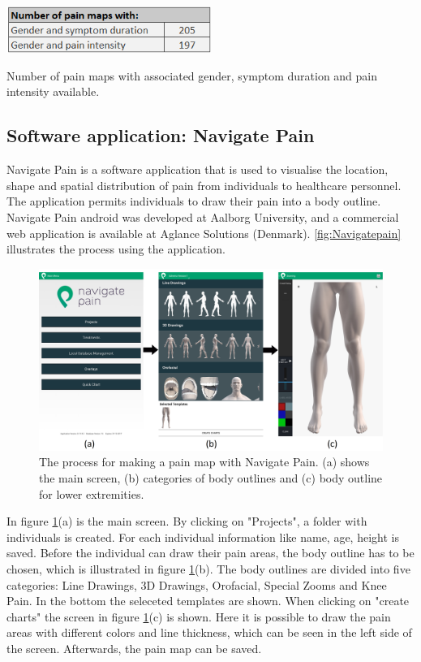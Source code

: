\begin{table} [H]
\centering
\includegraphics[width=0.5\textwidth]{figures/numberofpain}
\caption{Number of pain maps with associated gender, symptom duration and pain intensity  available. }
\label{tab:numberofpain}
\end{table}


\subsection{Software application: Navigate Pain} \label{sec:nav}
Navigate Pain is a software application that is used to visualise the location, shape and spatial distribution of pain from individuals to healthcare personnel. The application permits individuals to draw their pain into a body outline. Navigate Pain android was developed at Aalborg University, and a commercial web application is available at Aglance Solutions (Denmark).\citep{Solutions2015}
\autoref{fig:Navigatepain} illustrates the process using the application.

\begin{figure} [H]
\centering
\includegraphics[width=1\textwidth]{figures/Navigatepain}
\caption{The process for making a pain map with Navigate Pain. (a) shows the main screen, (b) categories of body outlines and (c) body outline for lower extremities.}
\label{fig:Navigatepain}
\end{figure}

\noindent
In figure \ref{fig:Navigatepain}(a) is the main screen. By clicking on "Projects", a folder with individuals is created. For each individual information like name, age, height is saved. Before the individual can draw their pain areas, the body outline has to be chosen, which is illustrated in figure \ref{fig:Navigatepain}(b). The body outlines are divided into five categories: Line Drawings, 3D Drawings, Orofacial, Special Zooms and Knee Pain. In the bottom the seleceted templates are shown. When clicking on "create charts" the screen in figure \ref{fig:Navigatepain}(c) is shown. Here it is possible to draw the pain areas with different colors and line thickness, which can be seen in the left side of the screen. Afterwards, the pain map can be saved.


